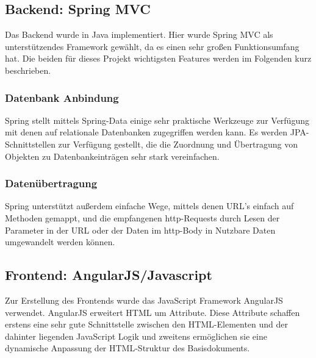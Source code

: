 \subsection{Backend: Spring MVC}
Das Backend wurde in Java implementiert. Hier wurde Spring MVC als unterstützendes Framework gewählt, da es einen sehr großen Funktionsumfang hat. Die beiden für dieses Projekt wichtigsten Features werden im Folgenden kurz beschrieben.

\subsubsection{Datenbank Anbindung}
Spring stellt mittels Spring-Data einige sehr praktische Werkzeuge zur Verfügung mit denen auf relationale Datenbanken zugegriffen werden kann. Es werden JPA-Schnittstellen zur Verfügung gestellt, die die Zuordnung und Übertragung von Objekten zu Datenbankeinträgen sehr stark vereinfachen.

\subsubsection{Datenübertragung}
Spring unterstützt außerdem einfache Wege, mittels denen URL's einfach auf Methoden gemappt, und die empfangenen http-Requests durch Lesen der Parameter in der URL oder der Daten im http-Body in Nutzbare Daten umgewandelt werden können.

\subsection{Frontend: AngularJS/Javascript}
Zur Erstellung des Frontends wurde das JavaScript Framework AngularJS verwendet. AngularJS erweitert HTML um Attribute. Diese Attribute schaffen erstens eine sehr gute Schnittstelle zwischen den HTML-Elementen und der dahinter liegenden JavaScript Logik und zweitens ermöglichen sie eine dynamische Anpassung der HTML-Struktur des Basisdokuments.
